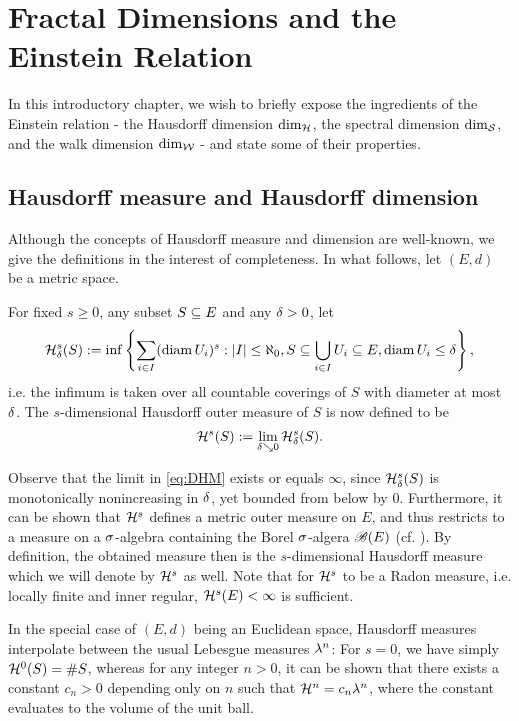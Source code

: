 \chapter{Fractal Dimensions and the Einstein Relation}

In this introductory chapter, we wish to briefly expose the ingredients of the Einstein relation - the Hausdorff dimension $\dim_{\mathcal{H}}$, the spectral dimension $\dim_{\mathcal{S}}$, and the walk dimension $\dim_{\mathcal{W}}$ - and state some of their properties. 

\section{Hausdorff measure and Hausdorff dimension}

Although the concepts of Hausdorff measure and dimension are well-known, we give the definitions in the interest of completeness. In what follows, let $(E,d)$ be a metric space.
\begin{defin}
  For fixed $s\geq0$, any subset $S\subseteq E$ and any $\delta>0$, let 
  \[
    \mathcal{H}^s_\delta(S)
      :=\inf \left\{\sum_{i\in I}(\operatorname{diam} U_i)^s:
            |I|\leq\aleph_0,S\subseteq\bigcup_{i\in I}U_i\subseteq E,\operatorname{diam} U_i\leq\delta\right\},
  \]
  i.e. the infimum is taken over all countable coverings of $S$ with diameter at most $\delta$. The $s$-dimensional Hausdorff outer measure of $S$ is now defined to be
  \begin{equation}\label{eq:DHM}
    \mathcal{H}^s(S):=\lim_{\delta\searrow0}\mathcal{H}^s_\delta(S).
  \end{equation}
\end{defin}
Observe that the limit in \eqref{eq:DHM} exists or equals $\infty$, since $\mathcal{H}^s_\delta(S)$ is monotonically nonincreasing in $\delta$, yet bounded from below by 0. Furthermore, it can be shown that $\mathcal{H}^s$ defines a metric outer measure on $E$, and thus restricts to a measure on a $\sigma$-algebra containing the Borel $\sigma$-algera $\mathscr{B}(E)$ (cf. \cite[p.54ff]{mattila1999geometry}). By definition, the obtained measure then is the $s$-dimensional Hausdorff measure which we will denote by $\mathcal{H}^s$ as well. Note that for $\mathcal{H}^s$ to be a Radon measure, i.e. locally finite and inner regular, $\mathcal{H}^s(E)<\infty$ is sufficient.

In the special case of $(E,d)$ being an Euclidean space, Hausdorff measures interpolate between the usual Lebesgue measures $\lambda^n$: For $s=0$, we have simply $\mathcal{H}^0(S)=\# S$, whereas for any integer $n>0$, it can be shown that there exists a constant $c_n>0$ depending only on $n$ such that $\mathcal{H}^n=c_n\lambda^n$, where the constant evaluates to the volume of the unit ball.

